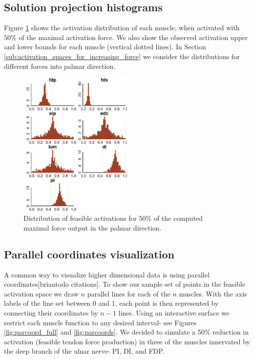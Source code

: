 \subsection{Solution projection histograms}
Figure \ref{fig:raw_histograms} shows the activation distribution of each muscle, when activated with $50\%$ of the maximal activation force. We also show the observed activation upper and lower bounds for each muscle (vertical dotted lines).
In Section \ref{sub:activation_spaces_for_increasing_force} we consider the distributions for different forces into palmar direction.
\begin{figure}[!htbp]
\centering
\includegraphics[width=0.5\textwidth]{figs/raw_histograms.pdf}
\caption{Distribution of feasible activations for 50\% of the computed maximal force output in the palmar direction.}
\label{fig:raw_histograms}
\end{figure}

\subsection{Parallel coordinates visualization}
A common way to visualize higher dimensional data is using parallel coordinates[briantodo citations]. To show our sample set of points in the feasible activation space we draw $n$ parallel lines for each of the $n$ muscles.
With the axis labels of the line set between 0 and 1, each point is then represented by connecting their coordinates by $n-1$ lines.
Using an interactive surface we restrict each muscle function to any desired interval- see Figures \ref{fig:parcoord_full} and \ref{fig:parcoords}.
We decided to simulate a 50\% reduction in activation (feasible tendon force production) in three of the muscles innervated by the deep branch of the ulnar nerve- PI, DI, and FDP. 

